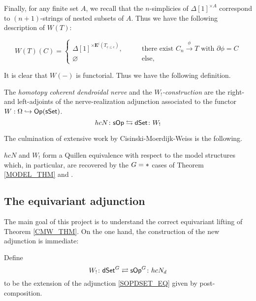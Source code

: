 \documentclass[a4paper,10pt
,draft
]{article}%
\renewcommand{\1}{\eta}%
\begin{document}
Finally, for any finite set $A$, we recall that the $n$-simplicies of $\Delta[1]^{\times A}$ correspond to $(n+1)$-strings of nested subsets of $A$.
Thus we have the following description of $W(T)$:

\begin{equation}
      \label{WT_EQ}
      W(T)(C) = 
      \begin{cases}
            \Delta[1]^{\times \mathbf E^i(T_{\underline e \leq e})}, \qquad & \mbox{there exist $C_n \xrightarrow{\phi} T$ with $\partial \phi = C$}
            \\
            \varnothing & \text{else,}
      \end{cases}
\end{equation}

It is clear that $W(-)$ is functorial. Thus we have the following definition.

\begin{definition}
      The \textit{homotopy coherent dendroidal nerve} and the \textit{$W_!$-construction}
      are the right- and left-adjoints of the nerve-realization adjunction associated to the functor $W: \Omega \hookrightarrow \mathsf{Op}(\mathsf{sSet})$.
      \begin{equation}
            \label{SOPDSET_EQ}
            hc N \colon \mathsf{sOp} \leftrightarrows
            \mathsf{dSet} \colon W_!
      \end{equation}
\end{definition}
The culmination of extensive work by Cisinski-Moerdijk-Weiss \cite{CM13a,CM13b,CM11,MW09,MW07} is the following.

\begin{theorem}
      \label{CMW_THM}
      $hcN$ and $W_!$ form a Quillen equivalence with respect to the model structures
      which, in particular, are recovered by the $G = \**$ cases of Theorem \ref{MODEL_THM} and \cite[Thm. 2.1]{Per_eds}.
\end{theorem}

\subsection{The equivariant adjunction}

The main goal of this project \cite{BP_geo,BP_edss,Per_eds} is to understand the correct equivariant lifting of Theorem \ref{CMW_THM}.
On the one hand, the construction of the new adjunction is immediate:

\begin{definition}
      Define
      \[
            W_! \colon \mathsf{dSet}^G \rightleftarrows \mathsf{sOp}^G \colon hcN_d
      \]
      to be the
      extension of the adjunction \eqref{SOPDSET_EQ}
      given by post-composition.
\end{definition}
\end{document}
